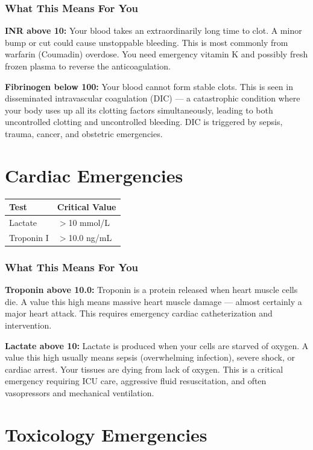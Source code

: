 \subsubsection{What This Means For You}

\textbf{INR above 10:} Your blood takes an extraordinarily long time to clot. A minor bump or cut could cause unstoppable bleeding. This is most commonly from warfarin (Coumadin) overdose. You need emergency vitamin K and possibly fresh frozen plasma to reverse the anticoagulation.

\textbf{Fibrinogen below 100:} Your blood cannot form stable clots. This is seen in disseminated intravascular coagulation (DIC) --- a catastrophic condition where your body uses up all its clotting factors simultaneously, leading to both uncontrolled clotting and uncontrolled bleeding. DIC is triggered by sepsis, trauma, cancer, and obstetric emergencies.

\clearpage
\section{Cardiac Emergencies}

\begin{longtable}{@{}ll@{}}
\toprule
\textbf{Test} & \textbf{Critical Value} \\
\midrule
Lactate & $>$10 mmol/L \\
Troponin I & $>$10.0 ng/mL \\
\bottomrule
\end{longtable}

\subsubsection{What This Means For You}

\textbf{Troponin above 10.0:} Troponin is a protein released when heart muscle cells die. A value this high means massive heart muscle damage --- almost certainly a major heart attack. This requires emergency cardiac catheterization and intervention.

\textbf{Lactate above 10:} Lactate is produced when your cells are starved of oxygen. A value this high usually means sepsis (overwhelming infection), severe shock, or cardiac arrest. Your tissues are dying from lack of oxygen. This is a critical emergency requiring ICU care, aggressive fluid resuscitation, and often vasopressors and mechanical ventilation.

\clearpage
\section{Toxicology Emergencies}

